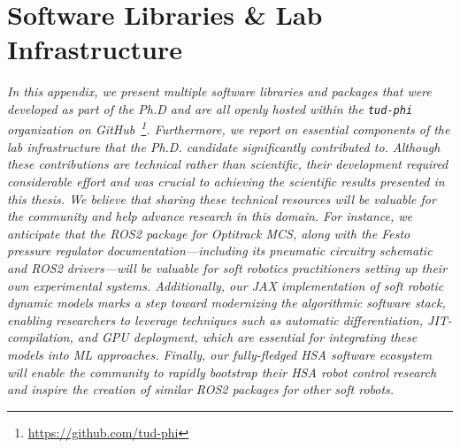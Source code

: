 \chapter{Software Libraries \& Lab Infrastructure}\label{chp:apx:infrastructure}

\textit{
    In this appendix, we present multiple software libraries and packages that were developed as part of the Ph.D and are all openly hosted within the \texttt{tud-phi} organization on GitHub~\footnote{\url{https://github.com/tud-phi}}. Furthermore, we report on essential components of the lab infrastructure that the Ph.D. candidate significantly contributed to.
    Although these contributions are technical rather than scientific, their development required considerable effort and was crucial to achieving the scientific results presented in this thesis. We believe that sharing these technical resources will be valuable for the community and help advance research in this domain.
    For instance, we anticipate that the ROS2 package for Optitrack \gls{MCS}, along with the Festo pressure regulator documentation—including its pneumatic circuitry schematic and ROS2 drivers—will be valuable for soft robotics practitioners setting up their own experimental systems. Additionally, our JAX implementation of soft robotic dynamic models marks a step toward modernizing the algorithmic software stack, enabling researchers to leverage techniques such as automatic differentiation, \gls{JIT}-compilation, and \gls{GPU} deployment, which are essential for integrating these models into \gls{ML} approaches. 
    Finally, our fully-fledged \gls{HSA} software ecosystem will enable the community to rapidly bootstrap their \gls{HSA} robot control research and inspire the creation of similar ROS2 packages for other soft robots.
}

